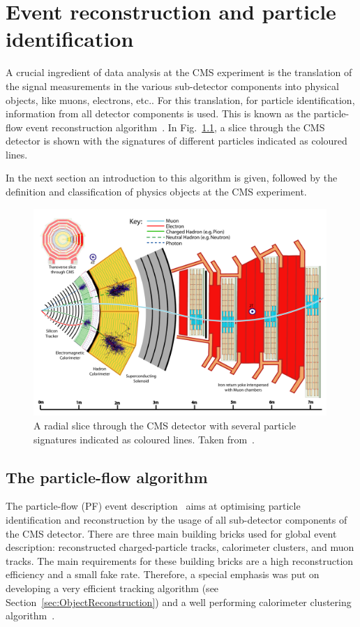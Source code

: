 \chapter{Event reconstruction and particle identification}
A crucial ingredient of data analysis at the CMS experiment is the translation of the signal measurements in the various sub-detector components into physical objects, like muons, electrons, etc..
For this translation, \ie for particle identification, information from all detector components is used.
This is known as the particle-flow event reconstruction algorithm~\cite{CMS-PAS-PFT-09-001}.
In Fig.~\ref{fig:CMSslice}, a slice through the CMS detector is shown with the signatures of different particles indicated as coloured lines.

In the next section an introduction to this algorithm is given, followed by the definition and classification of physics objects at the CMS experiment.
\begin{figure}[!ht]
  \centering
      \includegraphics[width=0.99\textwidth]{figures/experiment/ObjectReconstruction/slice_white_smaller_size.pdf}
  \caption{A radial slice through the CMS detector with several particle signatures indicated as coloured lines. Taken from~\cite{bib:Signatures_figure}.}  
  \label{fig:CMSslice}
\end{figure}


\section{The particle-flow algorithm}
\label{sec:PFalgorithm}
The particle-flow (PF) event description~\cite{CMS-PAS-PFT-09-001} aims at optimising particle identification and reconstruction by the usage of all sub-detector components of the CMS detector.
There are three main building bricks used for global event description: reconstructed charged-particle tracks, calorimeter clusters, and muon tracks.
The main requirements for these building bricks are a high reconstruction efficiency and a small fake rate.
Therefore, a special emphasis was put on developing a very efficient tracking algorithm (see Section~\ref{sec:ObjectReconstruction}) and a well performing calorimeter clustering algorithm~\cite{CMS-PAS-PFT-09-001}. 

